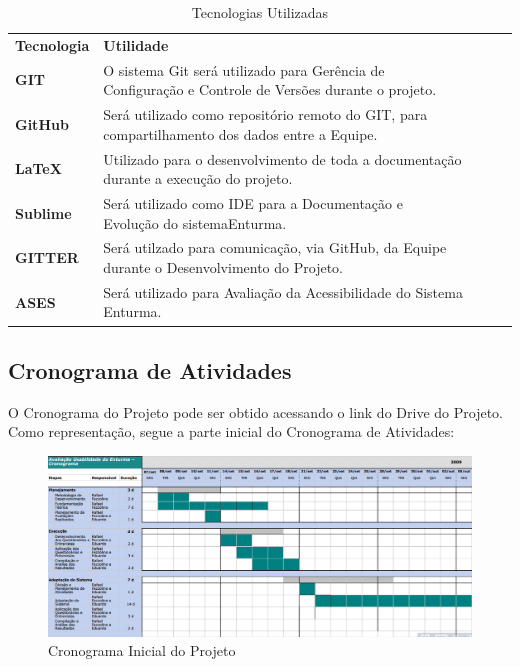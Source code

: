 	\begin{table}[]
		\centering
		
		\label{tecnologias}
		\begin{tabular}{|l|l|lll}
			\cline{1-2}
			{\bf Tecnologia} & {\bf Utilidade}                                                                                          & {\bf } &  &  \\ \cline{1-2}
			{\bf GIT}        & O sistema Git será utilizado para Gerência de Configuração e Controle de Versões durante o projeto.      &        &  &  \\ \cline{1-2}
			{\bf GitHub}     & Será utilizado como repositório remoto do GIT, para compartilhamento dos dados entre a Equipe.           &        &  &  \\ \cline{1-2}
			{\bf LaTeX}      & Utilizado para o desenvolvimento de toda a documentação durante a execução do projeto. &        &  &  \\ \cline{1-2}
			{\bf Sublime}    & Será utilizado como IDE para a Documentação e Evolução do sistemaEnturma.   &        &  &  \\ \cline{1-2}
			{\bf GITTER}     & Será utilzado para comunicação, via GitHub, da Equipe durante o Desenvolvimento do Projeto.                 &        &  &  \\ \cline{1-2}
			{\bf ASES}       & Será utilizado para Avaliação da Acessibilidade do Sistema Enturma. &        &  &  \\ \cline{1-2}
		\end{tabular}
		\caption{Tecnologias Utilizadas}
	\end{table}

\subsection{Cronograma de Atividades}

	O Cronograma do Projeto pode ser obtido acessando o link do Drive do Projeto. Como representação, segue a parte inicial do Cronograma de Atividades:

	\begin{figure}[H]
		\centering
		\includegraphics[width=1\textwidth]{imagens/cronograma}
		\caption{Cronograma Inicial do Projeto}
		\label{img:cronograma}
	\end{figure}


